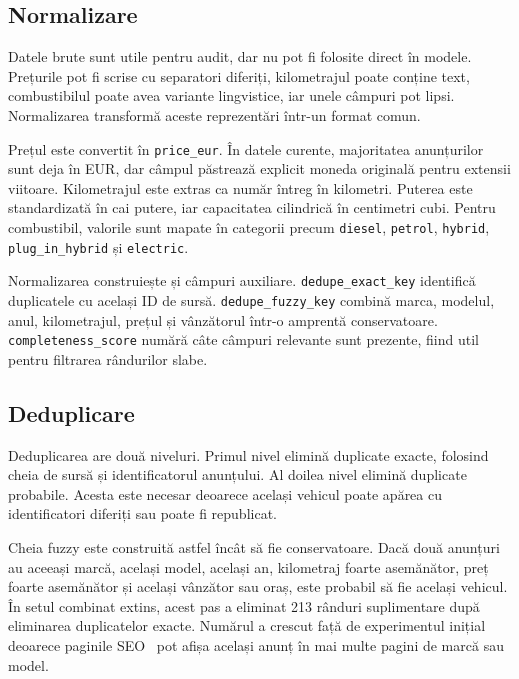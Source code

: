 \subsection{Normalizare}
\label{sec:data-normalization}

Datele brute sunt utile pentru audit, dar nu pot fi folosite direct în modele. Prețurile pot fi scrise cu separatori diferiți, kilometrajul poate conține text, combustibilul poate avea variante lingvistice, iar unele câmpuri pot lipsi. Normalizarea transformă aceste reprezentări într-un format comun.

Prețul este convertit în \texttt{price\_eur}. În datele curente, majoritatea anunțurilor sunt deja în EUR, dar câmpul păstrează explicit moneda originală pentru extensii viitoare. Kilometrajul este extras ca număr întreg în kilometri. Puterea este standardizată în cai putere, iar capacitatea cilindrică în centimetri cubi. Pentru combustibil, valorile sunt mapate în categorii precum \texttt{diesel}, \texttt{petrol}, \texttt{hybrid}, \texttt{plug\_in\_hybrid} și \texttt{electric}.

Normalizarea construiește și câmpuri auxiliare. \texttt{dedupe\_exact\_key} identifică duplicatele cu același ID de sursă. \texttt{dedupe\_fuzzy\_key} combină marca, modelul, anul, kilometrajul, prețul și vânzătorul într-o amprentă conservatoare. \texttt{completeness\_score} numără câte câmpuri relevante sunt prezente, fiind util pentru filtrarea rândurilor slabe.

\subsection{Deduplicare}
\label{sec:data-dedup}

Deduplicarea are două niveluri. Primul nivel elimină duplicate exacte, folosind cheia de sursă și identificatorul anunțului. Al doilea nivel elimină duplicate probabile. Acesta este necesar deoarece același vehicul poate apărea cu identificatori diferiți sau poate fi republicat.

Cheia fuzzy este construită astfel încât să fie conservatoare. Dacă două anunțuri au aceeași marcă, același model, același an, kilometraj foarte asemănător, preț foarte asemănător și același vânzător sau oraș, este probabil să fie același vehicul. În setul combinat extins, acest pas a eliminat 213 rânduri suplimentare după eliminarea duplicatelor exacte. Numărul a crescut față de experimentul inițial deoarece paginile SEO \mobilede\ pot afișa același anunț în mai multe pagini de marcă sau model.

